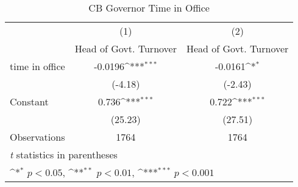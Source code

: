 \begin{table}[htbp]\centering
\def\sym#1{\ifmmode^{#1}\else\(^{#1}\)\fi}
\caption{CB Governor Time in Office \label{timeinoffHOGalone}}
\begin{tabular}{l*{2}{c}}
\toprule
                                        &\multicolumn{1}{c}{(1)}&\multicolumn{1}{c}{(2)}\\
                                        &\multicolumn{1}{c}{Head of Govt. Turnover}&\multicolumn{1}{c}{Head of Govt. Turnover}\\
\midrule
time in office                          &  -0.0196\sym{***}&  -0.0161\sym{*}  \\
                                        &  (-4.18)         &  (-2.43)         \\
\addlinespace
Constant                                &    0.736\sym{***}&    0.722\sym{***}\\
                                        &  (25.23)         &  (27.51)         \\
\midrule
Observations                            &     1764         &     1764         \\
\bottomrule
\multicolumn{3}{l}{\footnotesize \textit{t} statistics in parentheses}\\
\multicolumn{3}{l}{\footnotesize \sym{*} \(p<0.05\), \sym{**} \(p<0.01\), \sym{***} \(p<0.001\)}\\
\end{tabular}
\end{table}
